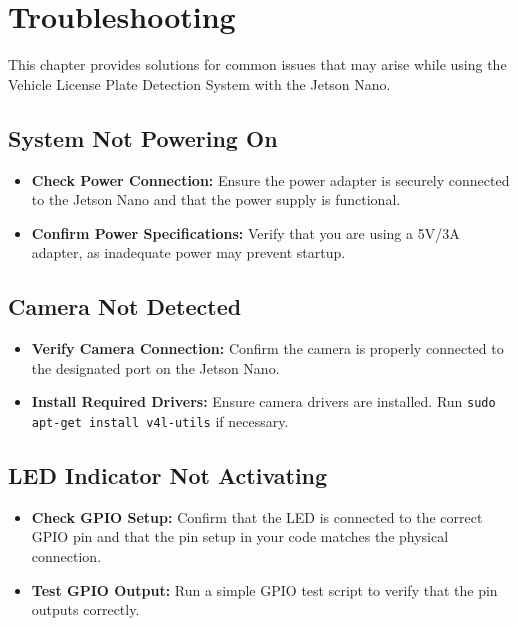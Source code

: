 %
%

\chapter{Troubleshooting}

This chapter provides solutions for common issues that may arise while using the Vehicle License Plate Detection System with the Jetson Nano.

\section{System Not Powering On}
\begin{itemize}[label=--, left=1.5em]
	\item \textbf{Check Power Connection:} Ensure the power adapter is securely connected to the Jetson Nano and that the power supply is functional.
	\item \textbf{Confirm Power Specifications:} Verify that you are using a 5V/3A adapter, as inadequate power may prevent startup.
\end{itemize}

\section{Camera Not Detected}
\begin{itemize}[label=--, left=1.5em]
	\item \textbf{Verify Camera Connection:} Confirm the camera is properly connected to the designated port on the Jetson Nano.
	\item \textbf{Install Required Drivers:} Ensure camera drivers are installed. Run \texttt{sudo apt-get install v4l-utils} if necessary.
\end{itemize}

\section{LED Indicator Not Activating}
\begin{itemize}[label=--, left=1.5em]
	\item \textbf{Check GPIO Setup:} Confirm that the LED is connected to the correct GPIO pin and that the pin setup in your code matches the physical connection.
	\item \textbf{Test GPIO Output:} Run a simple GPIO test script to verify that the pin outputs correctly.
\end{itemize}

